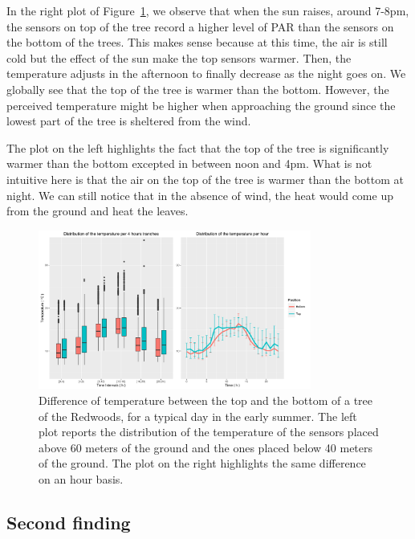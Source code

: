 \documentclass[11pt]{article}\usepackage[]{graphicx}\usepackage[]{color}
\begin{document}
In the right plot of Figure~\ref{fig:find1}, we observe that when the sun raises, around 7-8pm, the sensors on top of the tree record a higher level of PAR than the sensors on the bottom of the trees. This makes sense because at this time, the air is still cold but the effect of the sun make the top sensors warmer. Then, the temperature adjusts in the afternoon to finally decrease as the night goes on. We globally see that the top of the tree is warmer than the bottom. However, the perceived temperature might be higher when approaching the ground since the lowest part of the tree is sheltered from the wind.

The plot on the left highlights the fact that the top of the tree is significantly warmer than the bottom excepted in between noon and 4pm. What is not intuitive here is that the air on the top of the tree is warmer than the bottom at night. We can still notice that in the absence of wind, the heat would come up from the ground and heat the leaves.
\begin{figure}
  \centering
    \includegraphics[width=0.8\textwidth]{Find1.pdf}
  \caption{Difference of temperature between the top and the bottom of a tree of the Redwoods, for a typical day in the early summer. The left plot reports the distribution of the temperature of the sensors placed above 60 meters of the ground and the ones placed below 40 meters of the ground. The plot on the right highlights the same difference on an hour basis.}
  \label{fig:find1}
\end{figure}

\subsection{Second finding}
\end{document}
